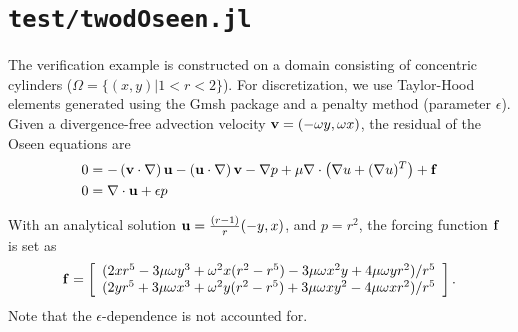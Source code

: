 \documentclass{amsart}
\begin{document}
\section*{ {\tt test/twodOseen.jl} }
The verification example is constructed on a domain consisting of
concentric cylinders ($\Omega = \{ (x,y) | 1<r<2 \}$).  For discretization,
we use Taylor-Hood elements generated using the Gmsh package and 
a penalty method (parameter $\epsilon$).  Given a divergence-free 
advection velocity ${\bf v} = (-\omega y,\omega x)$,
the residual of the Oseen equations are
%
\begin{align*}
  0 &= -\left( {\bf v}\cdot\nabla \right) {\bf u} - \left( {\bf u}\cdot \nabla
  \right) {\bf v} - \nabla p + \mu \nabla \cdot \left(\nabla u + (\nabla u)^T
  \right) + {\bf f} \\
  0 &= \nabla \cdot {\bf u} + \epsilon p
\end{align*}

With an analytical solution ${\bf u}= \frac{(r-1)}{r}(-y,x)$, and $p=r^2$, 
the forcing function ${\bf f}$ is set as
%
\begin{displaymath}
  {\bf f} = \left[ \begin{array}{c}
      (2xr^5-3\mu\omega y^3+\omega^2 x( r^2-r^5)-3\mu\omega x^2 y +
      4\mu\omega y r^2)/r^5 \\
      (2yr^5+3\mu\omega x^3 + \omega^2 y(r^2-r^5)+ 3\mu\omega x y^2
      -4\mu\omega x r^2)/r^5
  \end{array} \right].
\end{displaymath}
%
Note that the $\epsilon$-dependence is not accounted for.
\end{document}
